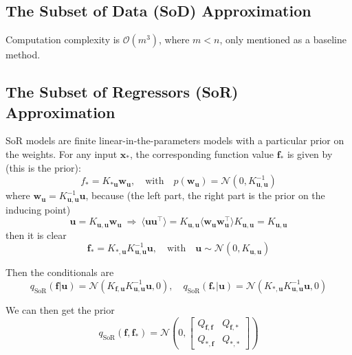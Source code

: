 \documentclass[10pt]{elegantbook}
\begin{document}
\subsection{The Subset of Data (SoD) Approximation}
Computation complexity is $\mathcal O(m^3)$, where $m < n$, only mentioned as a baseline method.

\subsection{The Subset of Regressors (SoR) Approximation}
SoR models are finite linear-in-the-parameters models with a particular prior on the weights.
For any input $\mathbf x_*$, the corresponding function value $\mathbf f_*$ is
given by (this is the prior):
\begin{equation}
    f_{*}=K_{*\mathbf{u}}\mathbf{w}_{\mathbf{u}},\quad
    \mathrm{with} \quad p(\mathbf{w}_{\mathbf{u}})=\mathcal{N}(0,K_{\mathbf{u},\mathbf{u}}^{-1})
\end{equation}
where $\mathbf w_{\mathbf u} = K_{\mathbf u, \mathbf u}^{-1} \mathbf u$, because (the left part, the right part is the prior on the inducing point)
\begin{equation}
    \mathbf{u}=K_{\mathbf{u,u}}\mathbf{w}_{\mathbf{u}}\ \Rightarrow\ 
    \langle\mathbf{u}\mathbf{u}^{\top}\rangle=K_{\mathbf{u,u}}\langle\mathbf{w}_{\mathbf{u}}\mathbf{w}_{\mathbf{u}}^{\top}\rangle K_{\mathbf{u,u}}=K_{\mathbf{u,u}}
\end{equation}
then it is clear
\begin{equation}
    \mathbf{f}_{*}
    =K_{*,\mathbf{u}}K_{\mathbf{u},\mathbf{u}}^{-1}\mathbf{u},\quad\mathrm{with}\quad\mathbf{u}\sim{\mathcal{N}}(0,K_{\mathbf{u},\mathbf{u}})
\end{equation}

Then the conditionals are
\begin{equation}
    q_{\text{SoR}}(\mathbf{f|u})=
    \mathcal{N}(K_{\mathbf{f,u}}K_{\mathbf{u,u}}^{-1}\mathbf{u},0),
    \quad q_{\text{SoR}}(\mathbf{f_{*}}|\mathbf{u})
    =\mathcal{N}(K_{*, \mathbf u}K_{\mathbf{u,u}}^{-1}\mathbf{u},0)
\end{equation}

We can then get the prior
\begin{equation}
    q_{\text{SoR}}(\mathbf f, \mathbf f_*) = \mathcal N \left ( 0, \begin{bmatrix}
        Q_{\mathbf f, \mathbf f} & Q_{\mathbf f, *} \\
        Q_{*, \mathbf f} & Q_{*, *}
    \end{bmatrix} \right )
\end{equation}
\end{document}

